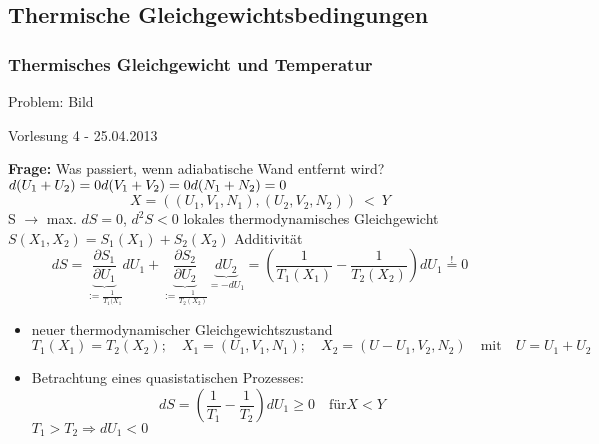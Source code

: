 \documentclass[10pt]{scrartcl}
\begin{document}
\begin{fleqn}
\subsection{Thermische Gleichgewichtsbedingungen}
\subsubsection{Thermisches Gleichgewicht und Temperatur}
Problem: Bild
\begin{flushright}
Vorlesung 4 - 25.04.2013
\end{flushright}
\textbf{Frage:} Was passiert, wenn adiabatische Wand entfernt wird?
$d(U_1+U_2)=0\\
d(V_1+V_2)=0\\
d(N_1+N_2)=0$
\begin{equation}
X=\left((U_1,V_1,N_1),(U_2,V_2,N_2)\right) \ < \ Y
\end{equation}
S $\rightarrow$ max.  $dS=0$, $d^2S<0$ lokales thermodynamisches Gleichgewicht\\
$S(X_1,X_2)=S_1(X_1)+S_2(X_2)$  Additivität
\begin{equation}
dS=\underbrace{\frac{\partial S_1}{\partial U_1}}_{:=\frac{1}{T_1(X_1}}dU_1 +\underbrace{\frac{\partial S_2}{\partial U_2}}_{:=\frac{1}{T_2(X_2)}}\underbrace{dU_2}_{=-dU_1} = \left(\frac{1}{T_1(X_1)}-\frac{1}{T_2(X_2)}\right)dU_1 \stackrel{!}{=} 0
\end{equation}
\begin{itemize}
  \item neuer thermodynamischer Gleichgewichtszustand
    \begin{equation}
      T_1(X_1) = T_2(X_2); \quad X_1=(U_1,V_1,N_1); \quad X_2=(U-U_1,V_2,N_2) \quad \text{mit} \quad U=U_1+U_2
    \end{equation}

  \item Betrachtung eines quasistatischen Prozesses:
    \begin{equation}
    dS=\left(\frac{1}{T_1}-\frac{1}{T_2}\right)dU_1 \geq 0 \quad \text{für} X<Y
    \end{equation}
    $T_1>T_2 \Rightarrow dU_1<0$
\end{itemize}

\end{fleqn}
\end{document}
